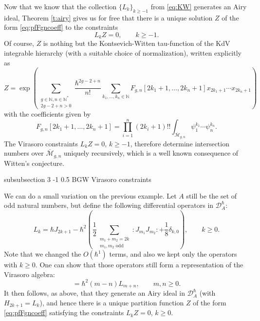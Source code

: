 \documentclass[reqno,oneside,11pt]{amsart}
\makeatletter
\theoremstyle{plain}
\theoremstyle{definition}
\theoremstyle{remark}
\numberwithin{equation}{section}
\renewcommand{\subsubsection}{\@startsection
{subsubsection}%
{3}%
{\z@}%
{-1\baselineskip}%
{0.5\baselineskip}%
{\normalfont \it \normalsize}} %
\newcommand{\DAh}{\mathcal{D}_A^{\hbar}}
\makeatother
\begin{document}
Now that we know that the collection $\{ L_k \}_{k \geq -1}$ from \eqref{eq:KW} generates an Airy ideal, Theorem \ref{t:airy} gives us for free that there is a unique solution $Z$ of the form \eqref{eq:pfFgncoeff} to the constraints
\begin{equation}
L_k Z = 0, \qquad k \geq -1.
\end{equation}
Of course, $Z$ is nothing but the Kontsevich-Witten tau-function of the KdV integrable hierarchy (with a suitable choice of normalization), written explicitly as
\begin{equation}
Z = \exp\left( \sum_{\substack{g \in  \mathbb{N}, n \in \mathbb{N}^* \\ 2g-2+n > 0}} \frac{\hbar^{2g-2+n}}{n!}  \sum_{k_1, \ldots, k_n \in \mathbb{N}}  F_{g,n}[2k_1+1, \ldots,2k_n+1]  x_{2k_1+1} \cdots x_{2k_n+1}\right)
\end{equation}
with the coefficients given by
\begin{equation}\label{eq:fgnairy}
F_{g,n}[2k_1+1, \ldots,2k_n+1] = \prod_{i=1}^n (2 k_i+1)!! \int_{\overline{\mathcal{M}}_{g,n}} \psi_1^{k_1} \cdots \psi_n^{k_n}.
\end{equation}
The Virasoro constraints $L_k Z = 0$, $k \geq -1$, therefore determine intersection numbers over $\overline{\mathcal{M}}_{g,n}$ uniquely recursively, which is a well known consequence of Witten's conjecture. 


\subsubsection{BGW Virasoro constraints}
\label{s:BGW}

We can do a small variation on the previous example. Let $A$ still be the set of odd natural numbers, but define the following differential operators in $\DAh$:
\begin{equation}\label{eq:BGW}
L_{k} = \hbar J_{2k+1}- \hbar^2 \left( \frac{1}{2}\sum_{\substack{m_1+m_2 =2 k\\ m_1, m_2 \text{ odd}}} : J_{m_1} J_{m_2}: + \frac{1}{8}\delta_{k,0} \right), \qquad k \geq 0.
\end{equation}
Note that we changed the $O(\hbar^1)$ terms, and also we kept only the operators with $k \geq 0$. One can show that those operators still form a representation of the Virasoro algebra:
\begin{equation}
[L_m, L_n] = \hbar^2 (m-n) L_{m+n}, \qquad m,n \geq 0.
\end{equation}
It then follows, as above, that they generate an Airy ideal in $\DAh$ (with $H_{2k+1} = L_k$), and hence there is a unique partition function $Z$ of the form \eqref{eq:pfFgncoeff} satisfying the constraints $L_k Z = 0$, $k \geq 0$. 
\end{document}

